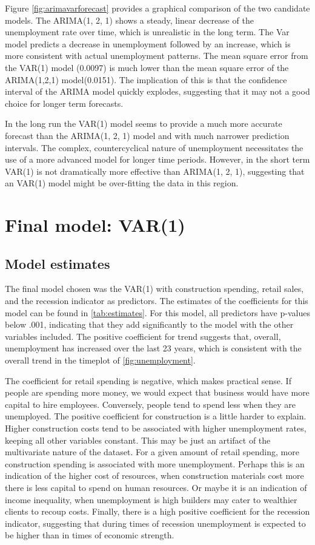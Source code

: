 \documentclass[twoside,twocolumn]{article}
\begin{document}
      Figure \ref{fig:arimavarforecast} provides a graphical comparison of the two candidate models.  The ARIMA(1, 2, 1) shows a steady, linear decrease of the unemployment rate over time, which is unrealistic in the long term.  The Var model predicts a decrease in unemployment followed by an increase, which is more consistent with actual unemployment patterns. The mean square error from the VAR(1) model (0.0097) is much lower than the mean square error of the ARIMA(1,2,1) model(0.0151). The implication of this is that  the confidence interval of the ARIMA model quickly explodes, suggesting that it may not a good choice for longer term forecasts.

In the long run the VAR(1) model seems to provide a much more accurate forecast than the ARIMA(1, 2, 1) model and with much narrower prediction intervals. The complex, countercyclical nature of unemployment necessitates the use of a more advanced model for longer time periods. However, in the short term VAR(1) is not dramatically more effective than ARIMA(1, 2, 1), suggesting that an VAR(1) model might be over-fitting the data in this region.


 \section{Final model: VAR(1)}

 \subsection{Model estimates} \label{estimates}

The final model chosen was the VAR(1) with construction spending, retail sales, and the recession indicator as predictors.
 The estimates of the coefficients for this model can be found in \ref{tab:estimates}. For this model, all predictors have p-values below .001, indicating that they add significantly to the model with the other variables included. The positive coefficient for trend suggests that, overall, unemployment has increased over the last 23 years, which is consistent with the overall trend in the timeplot of \ref{fig:unemployment}.


The coefficient for retail spending is negative, which makes practical sense. If people are spending more money, we would expect that business would have more capital to hire employees. Conversely, people tend to spend less when they are unemployed.  The positive coefficient for construction is a little harder to explain. Higher construction costs tend to be associated with higher unemployment rates, keeping all other variables constant.  This may be just an artifact of the multivariate nature of the dataset. For a given amount of retail spending, more construction spending is associated with more unemployment. Perhaps this is an indication of the higher cost of resources, when construction materials cost more there is less capital to spend on human resources. Or maybe it is an indication of income inequality, when unemployment is high builders may cater to wealthier clients to recoup costs. Finally, there is a high positive coefficient for the recession indicator, suggesting that during times of recession unemployment is expected to be higher than in times of economic strength.
\end{document}
